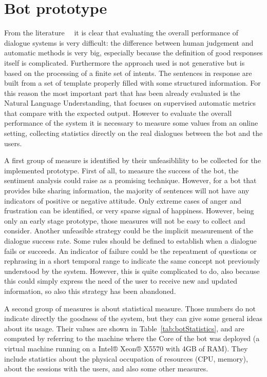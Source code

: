 \section{Bot prototype}
\label{validationPrototype}

From the literature~\cite{liu2016not}~\cite{li2015diversity} it is clear that evaluating the overall performance of dialogue systems is very difficult: the difference between human judgement and automatic methods is very big, especially because the definition of good responses itself is complicated. Furthermore the approach used is not generative but is based on the processing of a finite set of intents. The sentences in response are built from a set of template properly filled with some structured information. For this reason the most important part that has been already evaluated is the Natural Language Understanding, that focuses on supervised automatic metrics that compare with the expected output. However to evaluate the overall performance of the system it is necessary to measure some values from an online setting, collecting statistics directly on the real dialogues between the bot and the users.

A first group of measure is identified by their unfeasiblility to be collected for the implemented prototype. First of all, to measure the success of the bot, the sentiment analysis could raise as a promising technique. However, for a bot that provides bike sharing information, the majority of sentences will not have any indicators of positive or negative attitude. Only extreme cases of anger and frustration can be identified, or very sparse signal of happiness. However, being only an early stage prototype, those measures will not be easy to collect and consider. Another unfeasible strategy could be the implicit measurement of the dialogue success rate. Some rules should be defined to establish when a dialogue fails or succeeds. An indicator of failure could be the repeatment of questions or rephrasing in a short temporal range to indicate the same concept not previously understood by the system. However, this is quite complicated to do, also because this could simply express the need of the user to receive new and updated information, so also this strategy has been abandoned.



A second group of measures is about statistical measure. Those numbers do not indicate directly the goodness of the system, but they can give some general ideas about its usage. Their values are shown in Table~\ref{tab:botStatistics}, and are computed by referring to the machine where the Core of the bot was deployed (a virtual machine running on a Intel® Xeon® X5570 with 4GB of RAM). They include statistics about the physical occupation of resources (CPU, memory), about the sessions with the users, and also some other measures.

